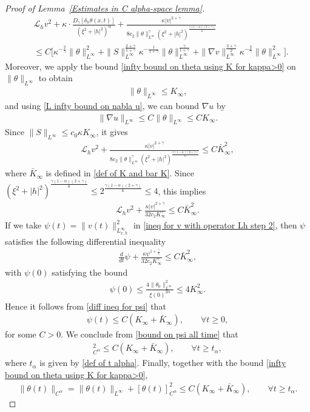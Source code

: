 \documentclass[reqno]{amsart}%
\theoremstyle{definition}
\theoremstyle{remark}
\numberwithin{equation}{section}
\newcommand{\bK}{\bar{K}_{\infty}}
\newcommand{\Dh}{\delta_{h}}
\newcommand{\1}{\mathbf{1}}
\newcommand{\Lh}{\mathcal{L}_{h}}
\newcommand{\K}{K_{\infty}}
\numberwithin{equation}{section}
\numberwithin{theorem}{section}
\numberwithin{figure}{section}
\begin{document}
\begin{proof}[Proof of Lemma~\ref{Estimates in C alpha-space lemma}]
\begin{align*}
&\Lh v^2+\kappa\cdot\frac{D_{\gamma}[\Dh\theta(x,t)]}{(\xi^2+|h|^2)^\alpha}+\frac{\kappa|v|^{2+\gamma}}{8c_2\|\theta\|^\gamma_{L^\infty}(\xi^2+|h|^2)^\frac{\gamma(1-\alpha)(2+\gamma)}{6}}\\
&\le C\Big[\kappa^{-\frac{2}{\gamma}}\|\theta\|^2_{L^\infty}+\|S\|^\frac{2+\gamma}{1+\gamma}_{L^\infty}\kappa^{-\frac{1}{1+\gamma}}\|\theta\|^{\frac{\gamma}{1+\gamma}}_{L^\infty}+\|\nabla v\|^\frac{2+\gamma}{2}_{L^\infty}\kappa^{-\frac{2}{\gamma}}\|\theta\|^2_{L^\infty}\Big].
\end{align*}
Moreover, we apply the bound \eqref{infty bound on theta using K for kappa>0} on $\|\theta\|_{L^\infty}$ to obtain
\begin{align*}
\|\theta\|_{L^\infty}\le\K,
\end{align*}
and using \eqref{L infty bound on nabla u}, we can bound $\nabla u$ by 
\begin{align}\label{L infty bound on nabla u general}
\|\nabla u\|_{L^\infty}\le C\|\theta\|_{L^\infty}\le C\K.
\end{align}
Since $\|S\|_{L^\infty}\le c_0\kappa\K$, it gives
\begin{align*}
\Lh v^2+\frac{\kappa|v|^{2+\gamma}}{8c_2\|\theta\|^\gamma_{L^\infty}(\xi^2+|h|^2)^\frac{\gamma(1-\alpha)(2+\gamma)}{6}}\le C\bK^2,
\end{align*}
where $\bK$ is defined in \eqref{def of K and bar K}. Since $(\xi^2+|h|^2)^\frac{\gamma(1-\alpha)(2+\gamma)}{6}\le 2^\frac{\gamma(1-\alpha)(2+\gamma)}{6}\le 4$, this implies
\begin{align}\label{ineq for v with operator Lh step 2}
\Lh v^2+\frac{\kappa|v|^{2+\gamma}}{32c_2\K^\gamma}\le C\bK^2.
\end{align}
If we take $\psi(t)=\|v(t)\|^2_{L^\infty_{x,h}}$ in \eqref{ineq for v with operator Lh step 2}, then $\psi$ satisfies the following differential inequality
\begin{align}\label{diff ineq for psi}
\frac{d}{dt}\psi+\frac{\kappa\psi^{1+\frac{\gamma}{2}}}{32c_2\K^\gamma}\le C\bK^2,
\end{align}
with $\psi(0)$ satisfying the bound 
\begin{align*}
\psi(0)\le\frac{4\|\theta_0\|^2_{L^\infty}}{\xi(0)^{2\alpha}}\le 4\K^2.
\end{align*}
Hence it follows from \eqref{diff ineq for psi} that 
\begin{align}\label{bound on psi all time}
\psi(t)\le C(\K+\bK),\qquad\forall t\ge0,
\end{align}
for some $C>0$. We conclude from \eqref{bound on psi all time} that 
\begin{align}
[\theta(t)]^2_{C^\alpha}\le C(\K+\bK),\qquad \forall t\ge t_{\alpha},
\end{align}
where $t_{\alpha}$ is given by \eqref{def of t alpha}. Finally, together with the bound \eqref{infty bound on theta using K for kappa>0}, 
\begin{align}
\|\theta(t)\|_{C^\alpha}=\|\theta(t)\|_{L^\infty}+[\theta(t)]^2_{C^\alpha}\le C(\K+\bK),\qquad \forall t\ge t_{\alpha}.
\end{align}


\end{proof}
\end{document}
